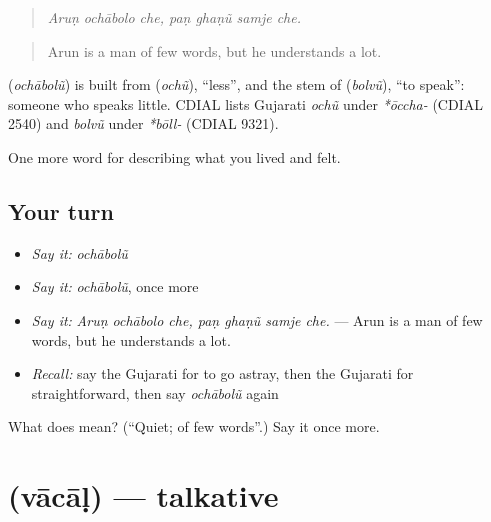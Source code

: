 \begin{quote}
\emph{Aruṇ ochābolo che, paṇ ghaṇũ samje che.}
\end{quote}

\begin{quote}
Arun is a man of few words, but he understands a lot.
\end{quote}

\begin{cousinweb}
\textbf{} (\emph{ochābolũ}) is built from \textbf{} (\emph{ochũ}), \textquotedblleft{}less\textquotedblright{}, and the stem of \textbf{} (\emph{bolvũ}), \textquotedblleft{}to speak\textquotedblright{}: someone who speaks little. CDIAL lists Gujarati \emph{ochũ} under \emph{*ōccha-} (CDIAL 2540) and \emph{bolvũ} under \emph{*bōll-} (CDIAL 9321).
\end{cousinweb}

\begin{grammarlens}[title={What you've built}]
One more word for describing what you lived and felt.
\end{grammarlens}

\subsection*{Your turn}
\begin{itemize}
\raggedright
  \item \emph{Say it:} \emph{ochābolũ}
  \item \emph{Say it:} \emph{ochābolũ}, once more
  \item \emph{Say it:} \emph{Aruṇ ochābolo che, paṇ ghaṇũ samje che.} — Arun is a man of few words, but he understands a lot.
  \item \emph{Recall:} say the Gujarati for to go astray, then the Gujarati for straightforward, then say \emph{ochābolũ} again
\end{itemize}

\begin{tcolorbox}[breakable,colback=teal!4,colframe=teal!35!black,title={Before you move on}]
What does  mean? (\textquotedblleft{}Quiet; of few words\textquotedblright{}.) Say it once more.
\end{tcolorbox}
\section[\texorpdfstring{\gu{વાચાળ} (vācāḷ)}{વાચાળ (vācāḷ)}]{ (vācāḷ) — talkative}

